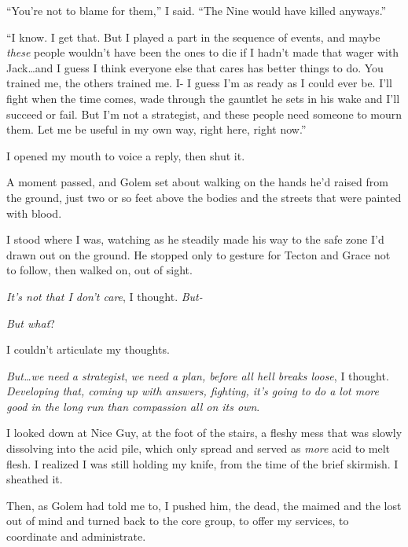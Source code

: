 ``You're not to blame for them,'' I said.  ``The Nine would have killed anyways.''



``I know.  I get that.  But I played a part in the sequence of events, and maybe \emph{these} people wouldn't have been the ones to die if I hadn't made that wager with Jack\ldots and I guess I think everyone else that cares has better things to do.  You trained me, the others trained me.  I- I guess I'm as ready as I could ever be.  I'll fight when the time comes, wade through the gauntlet he sets in his wake and I'll succeed or fail.  But I'm not a strategist, and these people need someone to mourn them.  Let me be useful in my own way, right here, right now.''



I opened my mouth to voice a reply, then shut it.



A moment passed, and Golem set about walking on the hands he'd raised from the ground, just two or so feet above the bodies and the streets that were painted with blood.



I stood where I was, watching as he steadily made his way to the safe zone I'd drawn out on the ground.  He stopped only to gesture for Tecton and Grace not to follow, then walked on, out of sight.



\emph{It's not that I don't care}, I thought.  \emph{But-}



\emph{But what}?



I couldn't articulate my thoughts.



\emph{But\ldots we need a strategist}, \emph{we need a plan, before all hell breaks loose}, I thought.  \emph{Developing that, coming up with answers, fighting, it's going to do a lot more good in the long run than compassion all on its own}.



I looked down at Nice Guy, at the foot of the stairs, a fleshy mess that was slowly dissolving into the acid pile, which only spread and served as \emph{more} acid to melt flesh.  I realized I was still holding my knife, from the time of the brief skirmish.  I sheathed it.



Then, as Golem had told me to, I pushed him, the dead, the maimed and the lost out of mind and turned back to the core group, to offer my services, to coordinate and administrate.





